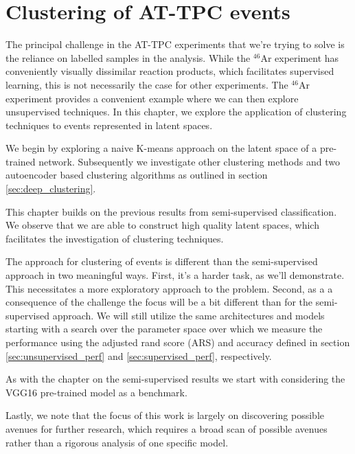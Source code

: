 \chapter{Clustering of AT-TPC events}\label{chap:clustering}

The principal challenge in the AT-TPC experiments that we're trying to solve is the reliance on labelled samples in the analysis. While the ${}^{46}$Ar experiment has conveniently visually dissimilar reaction products, which facilitates supervised learning, this is not necessarily the case for other experiments. The ${}^{46}$Ar experiment provides a convenient example where we can then explore unsupervised techniques. In this chapter, we explore the application of clustering techniques to events represented in latent spaces. 

We begin by exploring a naive K-means approach on the latent space of a pre-trained network. Subsequently we investigate other clustering methods and two autoencoder based clustering algorithms as outlined in section \ref{sec:deep_clustering}.

This chapter builds on the previous results from semi-supervised classification. We observe that we are able to construct high quality latent spaces, which facilitates the investigation of clustering techniques. 

The approach for clustering of events is different than the semi-supervised approach in two meaningful ways. First, it's a harder task, as we'll demonstrate. This necessitates a more exploratory approach to the problem. Second, as a a consequence of the challenge the focus will be a bit different than for the semi-supervised approach. We will still utilize the same architectures and models starting with a search over the parameter space over which we measure the performance using the adjusted rand score (ARS) and accuracy defined in section \ref{sec:unsupervised_perf} and \ref{sec:supervised_perf}, respectively.

As with the chapter on the semi-supervised results we start with considering the VGG16 pre-trained model as a benchmark.

Lastly, we note that the focus of this work is largely on discovering possible avenues for further research, which requires a broad scan of possible avenues rather than a rigorous analysis of one specific model.